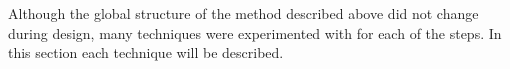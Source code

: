 Although the global structure of the method described above did not change during design, many techniques were experimented with for each of the steps. In this section each technique will be described.








